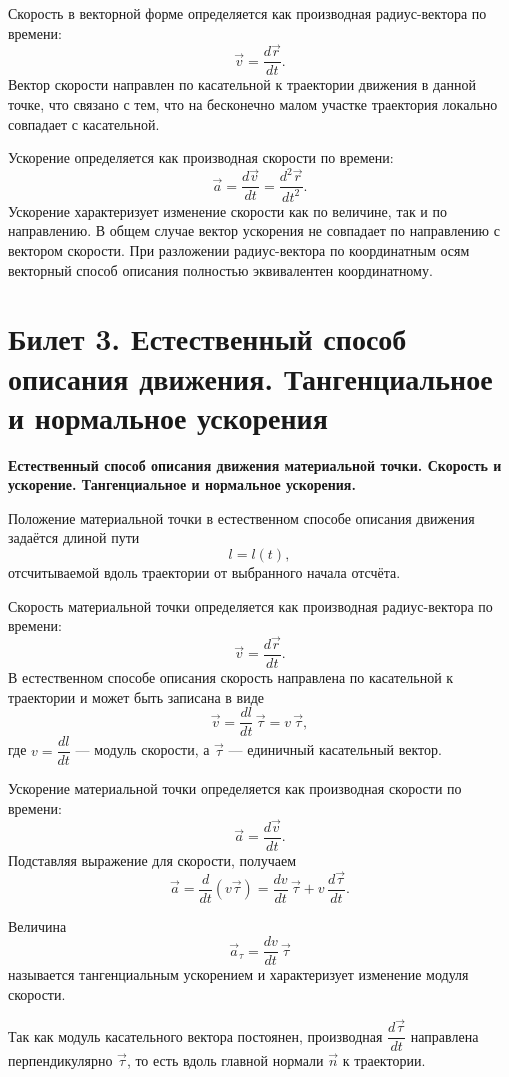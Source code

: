 \documentclass[a4paper,12pt]{article}
\begin{document}
Скорость в векторной форме определяется как производная радиус-вектора по времени:
\[
\vec v = \frac{d\vec r}{dt}.
\]
Вектор скорости направлен по касательной к траектории движения в данной точке, что связано с тем, что на бесконечно малом участке траектория локально совпадает с касательной.

Ускорение определяется как производная скорости по времени:
\[
\vec a = \frac{d\vec v}{dt} = \frac{d^2 \vec r}{dt^2}.
\]
Ускорение характеризует изменение скорости как по величине, так и по направлению. В общем случае вектор ускорения не совпадает по направлению с вектором скорости. При разложении радиус-вектора по координатным осям векторный способ описания полностью эквивалентен координатному.

\bigskip

\section*{Билет 3. Естественный способ описания движения. Тангенциальное и нормальное ускорения}

\textbf{Естественный способ описания движения материальной точки. 
Скорость и ускорение. Тангенциальное и нормальное ускорения.}

Положение материальной точки в естественном способе описания движения
задаётся длиной пути
\[
l = l(t),
\]
отсчитываемой вдоль траектории от выбранного начала отсчёта.

Скорость материальной точки определяется как производная радиус-вектора
по времени:
\[
\vec v = \frac{d\vec r}{dt}.
\]
В естественном способе описания скорость направлена по касательной
к траектории и может быть записана в виде
\[
\vec v = \frac{dl}{dt}\,\vec\tau = v\,\vec\tau,
\]
где \(v = \dfrac{dl}{dt}\) --- модуль скорости, а \(\vec\tau\) ---
единичный касательный вектор.

Ускорение материальной точки определяется как производная скорости
по времени:
\[
\vec a = \frac{d\vec v}{dt}.
\]
Подставляя выражение для скорости, получаем
\[
\vec a = \frac{d}{dt}(v\vec\tau)
= \frac{dv}{dt}\,\vec\tau + v\,\frac{d\vec\tau}{dt}.
\]

Величина
\[
\vec a_\tau = \frac{dv}{dt}\,\vec\tau
\]
называется тангенциальным ускорением и характеризует изменение модуля
скорости.

Так как модуль касательного вектора постоянен, производная
\(\dfrac{d\vec\tau}{dt}\) направлена перпендикулярно \(\vec\tau\), то есть
вдоль главной нормали \(\vec n\) к траектории.
\end{document}
